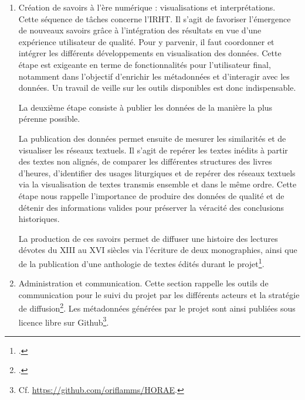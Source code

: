 \documentclass[a4paper,12pt,twoside]{book}
\begin{document}
\begin{enumerate}
	    Enfin, comme pour les grandes étapes précédentes, cette tâche se conclut par la création d'une interface de visualisation qui permet de valider les alignements de textes élémentaires détectés\footcite[p. 14-15]{HORAE_projet}. \\
	    
	    \item \og Création de savoirs à l'ère numérique : visualisations et interprétations\fg{}. \\
	    
	    Cette séquence de tâches concerne l'IRHT. Il s'agit de favoriser l'émergence de nouveaux savoirs grâce à l'intégration des résultats en vue d'une expérience utilisateur de qualité. Pour y parvenir, il faut coordonner et intégrer les différents développements en visualisation des données. Cette étape est exigeante en terme de fonctionnalités pour l'utilisateur final, notamment dans l'objectif d'enrichir les métadonnées et d'interagir avec les données. Un travail de veille sur les outils disponibles est donc indispensable. 
	    
	    La deuxième étape consiste à publier les données de la manière la plus pérenne possible. 
	    
	    La publication des données permet ensuite de mesurer les similarités et de visualiser les réseaux textuels. Il s'agit de repérer les textes inédits à partir des textes non alignés, de comparer les différentes structures des livres d'heures, d'identifier des usages liturgiques et de repérer des réseaux textuels via la visualisation de textes transmis ensemble et dans le même ordre. Cette étape nous rappelle l'importance de produire des données de qualité et de détenir des informations valides pour préserver la véracité des conclusions historiques. 
	    
	    La production de ces savoirs permet de diffuser une histoire des lectures dévotes du \textsc{XIII} au \textsc{XVI} siècles via l'écriture de deux monographies, ainsi que de la publication d'une anthologie de textes édités durant le projet\footcite[p. 15-16]{HORAE_projet}. \\
	    
	    \item \og Administration et communication\fg{}. Cette section rappelle les outils de communication pour le suivi du projet par les différents acteurs et la stratégie de diffusion\footcite[p. 16-17]{HORAE_projet}. Les métadonnées générées par le projet sont ainsi publiées sous licence libre sur Github\footnote{Cf. \url{https://github.com/oriflamms/HORAE}.}.\\
	    	\end{enumerate}
	    
\end{document}
